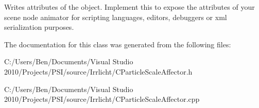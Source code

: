 Writes attributes of the object. Implement this to expose the attributes of your scene node animator for scripting languages, editors, debuggers or xml serialization purposes. 

The documentation for this class was generated from the following files\-:\begin{DoxyCompactItemize}
\item 
C\-:/\-Users/\-Ben/\-Documents/\-Visual Studio 2010/\-Projects/\-P\-S\-I/source/\-Irrlicht/C\-Particle\-Scale\-Affector.\-h\item 
C\-:/\-Users/\-Ben/\-Documents/\-Visual Studio 2010/\-Projects/\-P\-S\-I/source/\-Irrlicht/C\-Particle\-Scale\-Affector.\-cpp\end{DoxyCompactItemize}

